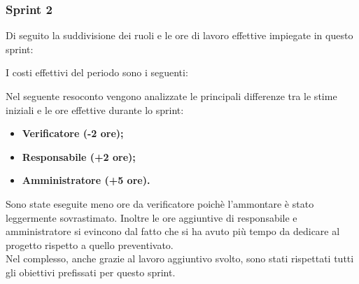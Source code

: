 \subsubsection{Sprint 2}
Di seguito la suddivisione dei ruoli e le ore di lavoro effettive impiegate in questo sprint:



I costi effettivi del periodo sono i seguenti:



Nel seguente resoconto vengono analizzate le principali differenze tra le stime iniziali e le ore effettive durante lo sprint:
\begin{itemize}
    \item \textbf{Verificatore (-2 ore);} 
    \item \textbf{Responsabile (+2 ore);} 
    \item \textbf{Amministratore (+5 ore).}
\end{itemize}
Sono state eseguite meno ore da verificatore poichè l'ammontare è stato leggermente sovrastimato. Inoltre le ore aggiuntive di responsabile e amministratore si evincono dal fatto che si ha avuto più tempo da dedicare al progetto rispetto
a quello preventivato.
\\
Nel complesso, anche grazie al lavoro aggiuntivo svolto, sono stati rispettati tutti gli obiettivi prefissati per questo sprint.


